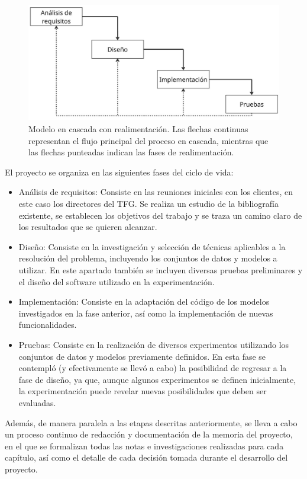 \begin{figure}[h]
    \centering
    \includegraphics[width=0.8\linewidth]{img/modelo_cascada.jpg}
    \caption[Modelo en cascada realimentado.]{Modelo en cascada con realimentación. Las flechas continuas representan el flujo principal del proceso en cascada, mientras que las flechas punteadas indican las fases de realimentación.}\label{fig:modelo_cascada}
\end{figure}

El proyecto se organiza en las siguientes fases del ciclo de vida:

\begin{itemize}
    \item Análisis de requisitos: Consiste en las reuniones iniciales con los clientes, en este caso los directores del TFG. Se realiza un estudio de la bibliografía existente, se establecen los objetivos del trabajo y se traza un camino claro de los resultados que se quieren alcanzar.
    \item Diseño: Consiste en la investigación y selección de técnicas aplicables a la resolución del problema, incluyendo los conjuntos de datos y modelos a utilizar. En este apartado también se incluyen diversas pruebas preliminares y el diseño del software utilizado en la experimentación.
    \item Implementación: Consiste en la adaptación del código de los modelos investigados en la fase anterior, así como la implementación de nuevas funcionalidades.
    \item Pruebas: Consiste en la realización de diversos experimentos utilizando los conjuntos de datos y modelos previamente definidos. En esta fase se contempló (y efectivamente se llevó a cabo) la posibilidad de regresar a la fase de diseño, ya que, aunque algunos experimentos se definen inicialmente, la experimentación puede revelar nuevas posibilidades que deben ser evaluadas.
\end{itemize}

Además, de manera paralela a las etapas descritas anteriormente, se lleva a cabo un proceso continuo de redacción y documentación de la memoria del proyecto, en el que se formalizan todas las notas e investigaciones realizadas para cada capítulo, así como el detalle de cada decisión tomada durante el desarrollo del proyecto.


